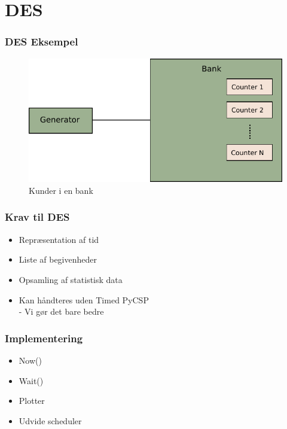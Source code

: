 \documentclass[12pt]{beamer}
\begin{document}
\section{DES}

\begin{frame}
  \frametitle{DES Eksempel}
\begin{figure}
 \begin{center}
  \includegraphics[scale=0.75]{bank_example}
	\caption{Kunder i en bank}
	\label{fig:hard-rtp}
\end{center}
\end{figure}
\end{frame}

\begin{frame}
  \frametitle{Krav til DES}
  \begin{itemize}   
	\item Repræsentation af tid
	\item Liste af begivenheder
	\item Opsamling af statistisk data
  \end{itemize}
  \begin {itemize}
  \item Kan håndteres uden Timed PyCSP \\
   - Vi gør det bare bedre
  \end{itemize}
\end{frame}

\begin{frame}
\frametitle{Implementering}
  \begin{itemize}   
	\item Now()
	\item Wait()
	\item Plotter
	\item Udvide scheduler
  \end{itemize}
\end{frame}
\end{document}
